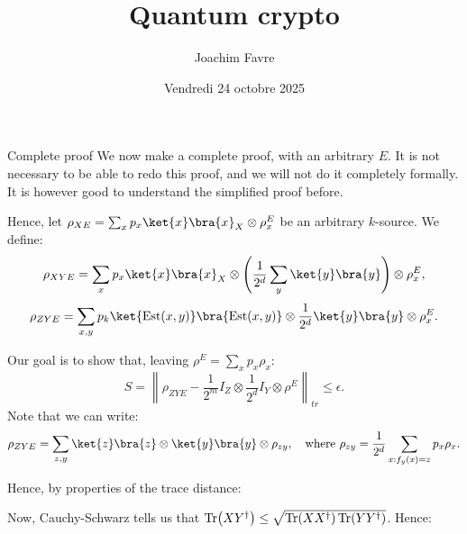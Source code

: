 \documentclass[a4paper]{article}
\title{Quantum crypto}
\author{Joachim Favre}
\date{Vendredi 24 octobre 2025}
\begin{document}
\maketitle


\begin{parag}{}
    \begin{subparag}{Complete proof}
        We now make a complete proof, with an arbitrary $E$. It is not necessary to be able to redo this proof, and we will not do it completely formally. It is however good to understand the simplified proof before.

        Hence, let $\rho_{XE} = \sum_{x} p_x \ket{x}\bra{x}_X \otimes \rho_x^E$ be an arbitrary $k$-source. We define: 
        \[\rho_{XYE} = \sum_{x} p_x \ket{x}\bra{x}_X \otimes \left(\frac{1}{2^d} \sum_{y} \ket{y}\bra{y}\right) \otimes \rho_x^E,\]
        \[\rho_{ZYE} = \sum_{x, y} p_k \ket{\text{Est}\left(x, y\right)}\bra{\text{Est}\left(x, y\right)} \otimes \frac{1}{2^d} \ket{y}\bra{y} \otimes \rho_x^E.\]

        Our goal is to show that, leaving $\rho^E = \sum_{x} p_x \rho_x$: 
        \[S = \left\|\rho_{ZYE} - \frac{1}{2^m} I_Z \otimes \frac{1}{2^d} I_Y \otimes \rho^E\right\|_{tr} \leq \epsilon.\]
        Note that we can write: 
        \[\rho_{ZYE} = \sum_{z, y} \ket{z}\bra{z} \otimes \ket{y}\bra{y} \otimes \rho_{zy}, \mathspace \text{where } \rho_{zy} = \frac{1}{2^d} \sum_{x: f_y\left(x\right) = z} p_x \rho_x.\]
        
        Hence, by properties of the trace distance: 
        
        Now, Cauchy-Schwarz tells us that $\Tr\left(X Y^{\dagger}\right) \leq \sqrt{\Tr\left(X X^{\dagger}\right) \Tr\left(Y Y^{\dagger}\right)}$. Hence: 


\end{subparag}
\end{parag}
\end{document}
